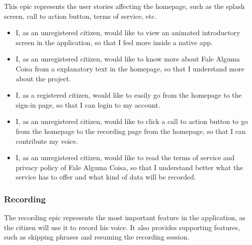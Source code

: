 This epic represents the user stories affecting the homepage, such as the splash screen, call to action button, terms of service, etc.

\begin{itemize}
    \item I, as an unregistered citizen, would like to view an animated introductory screen in the application, so that I feel more inside a native app.
    \item I, as an unregistered citizen, would like to know more about Fale Alguma Coisa from a explanatory text in the homepage, so that I understand more about the project.
    \item I, as a registered citizen, would like to easily go from the homepage to the sign-in page, so that I can login to my account.
    \item I, as an unregistered citizen, would like to click a call to action button to go from the homepage to the recording page from the homepage, so that I can contribute my voice.
    \item I, as an unregistered citizen, would like to read the terms of service and privacy policy of Fale Alguma Coisa, so that I understand better what the service has to offer and what kind of data will be recorded.
\end{itemize}

\subsubsection{Recording}

The recording epic represents the most important feature in the application, as the citizen will use it to record his voice. It also provides supporting features, such as skipping phrases and resuming the recording session.

